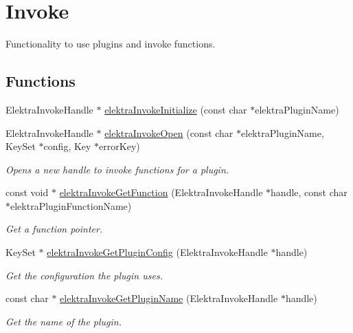\hypertarget{group__invoke}{}\section{Invoke}
\label{group__invoke}


Functionality to use plugins and invoke functions.  


\subsection*{Functions}
\begin{DoxyCompactItemize}
\item 
Elektra\+Invoke\+Handle $\ast$ \mbox{\hyperlink{group__invoke_gaae89e2497eba478be2043f1b25adbb3c}{elektra\+Invoke\+Initialize}} (const char $\ast$elektra\+Plugin\+Name)
\item 
Elektra\+Invoke\+Handle $\ast$ \mbox{\hyperlink{group__invoke_ga3eb20131e9a8fc9a6cebf126927c09bc}{elektra\+Invoke\+Open}} (const char $\ast$elektra\+Plugin\+Name, Key\+Set $\ast$config, Key $\ast$error\+Key)
\begin{DoxyCompactList}\small\item\em Opens a new handle to invoke functions for a plugin. \end{DoxyCompactList}\item 
const void $\ast$ \mbox{\hyperlink{group__invoke_ga4531a643a71a63c19c94d87bd8d0b40f}{elektra\+Invoke\+Get\+Function}} (Elektra\+Invoke\+Handle $\ast$handle, const char $\ast$elektra\+Plugin\+Function\+Name)
\begin{DoxyCompactList}\small\item\em Get a function pointer. \end{DoxyCompactList}\item 
Key\+Set $\ast$ \mbox{\hyperlink{group__invoke_gafc090b80f3ba846bf3c3fd8ccd34f2f5}{elektra\+Invoke\+Get\+Plugin\+Config}} (Elektra\+Invoke\+Handle $\ast$handle)
\begin{DoxyCompactList}\small\item\em Get the configuration the plugin uses. \end{DoxyCompactList}\item 
const char $\ast$ \mbox{\hyperlink{group__invoke_ga13bd3afe428624d459239df73641d769}{elektra\+Invoke\+Get\+Plugin\+Name}} (Elektra\+Invoke\+Handle $\ast$handle)
\begin{DoxyCompactList}\small\item\em Get the name of the plugin. \end{DoxyCompactList}\item 

\end{DoxyCompactItemize}
